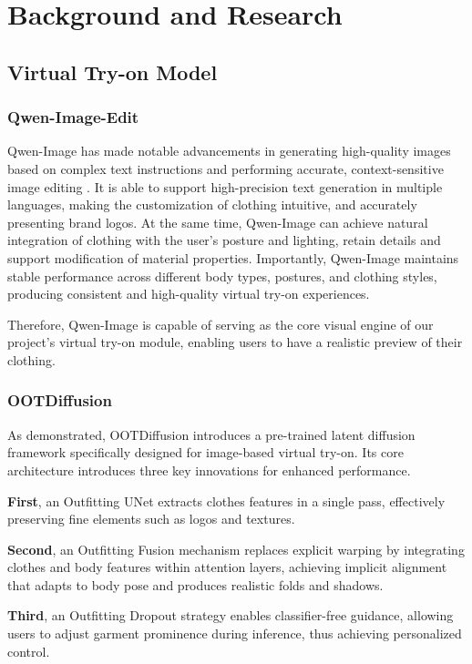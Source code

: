 \chapter{Background and Research}
\label{ch:technical_background}

\section{Virtual Try-on Model}
\subsection{Qwen-Image-Edit}
Qwen-Image has made notable advancements in generating high-quality images based on complex text instructions and performing accurate, context-sensitive image editing \citep{wu2025qwenimage}. It is able to support high-precision text generation in multiple languages, making the customization of clothing intuitive, and accurately presenting brand logos. At the same time, Qwen-Image can achieve natural integration of clothing with the user's posture and lighting, retain details and support modification of material properties. Importantly, Qwen-Image maintains stable performance across different body types, postures, and clothing styles, producing consistent and high-quality virtual try-on experiences. 


\noindent Therefore, Qwen-Image is capable of serving as the core visual engine of our project's virtual try-on module, enabling users to have a realistic preview of their clothing.


\subsection{OOTDiffusion}
As \cite{xu2025ootddiffusion} demonstrated, OOTDiffusion introduces a pre-trained latent diffusion framework specifically designed for image-based virtual try-on. Its core architecture introduces three key innovations for enhanced performance.

\textbf{First}, an Outfitting UNet extracts clothes features in a single pass, effectively preserving fine elements such as logos and textures.

\textbf{Second}, an Outfitting Fusion mechanism replaces explicit warping by integrating clothes and body features within attention layers, achieving implicit alignment that adapts to body pose and produces realistic folds and shadows.

\textbf{Third}, an Outfitting Dropout strategy enables classifier-free guidance, allowing users to adjust garment prominence during inference, thus achieving personalized control.


